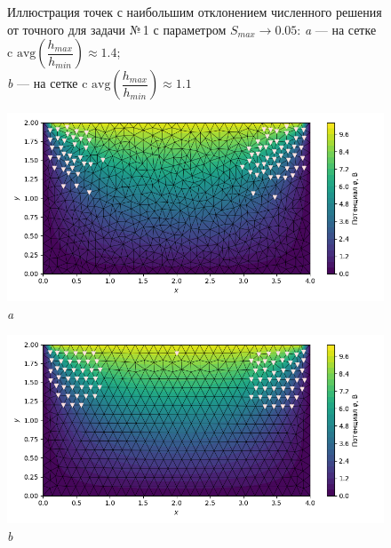 \documentclass[12pt, a4paper]{article}
\begin{document}
\begin{figure}[!h]
\begin{center}
				\end{center} 
				\vspace*{-0.0mm} 
				\caption{Иллюстрация точек с наибольшим отклонением численного решения от точного для задачи №\,1 с параметром $S_{max} \rightarrow 0.05$: 
					\textit{a} --- на сетке c $\mathrm{avg} \left( \dfrac{h_{max}}{h_{min}} \right) \approx 1.4 $;\\
					\textit{b} --- на сетке c $\mathrm{avg} \left( \dfrac{h_{max}}{h_{min}} \right) \approx 1.1$
				} 
				\label{fig: max_err_005}
			\end{figure}
			
			\newpage
			
			\begin{figure}[!h]  
				\centering     
				\vspace{5.0mm} 
				\begin{center} 
					{ 
						\begin{minipage}{0.45\textwidth} 
							\centering 
							\hspace*{-32.7mm}
							\includegraphics[width=1.4\columnwidth]{rect_dirichlet_only_001_err_nodes.png}\\ 
							\hspace*{-42.7mm}
							\textit{a} 
						\end{minipage}                                 
					} 
					{ 
						\begin{minipage}{0.45\textwidth} 
							\centering 
							\hspace*{-8.2mm}
							\includegraphics[width=1.4\columnwidth]{rect_dirichlet_only_001_calfem_err_nodes.png}\\
							\hspace*{2.2mm} 
							\textit{b} 
						\end{minipage}                                 
					} 
					

\end{center}
\end{figure}
\end{document}
